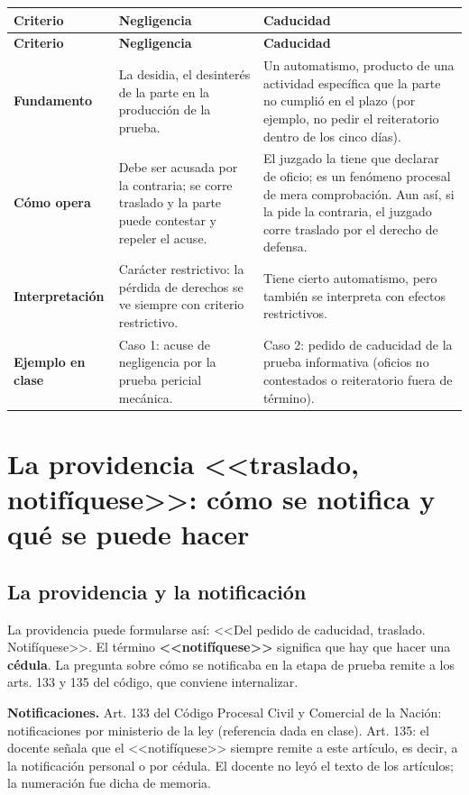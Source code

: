 \documentclass[12pt,oneside]{book}
\begin{document}
\begin{longtable}{@{}L{0.15\textwidth}L{0.36\textwidth}L{0.39\textwidth}@{}}
\toprule
\textbf{Criterio} & \textbf{Negligencia} & \textbf{Caducidad} \\
\midrule
\endfirsthead
\toprule
\textbf{Criterio} & \textbf{Negligencia} & \textbf{Caducidad} \\
\midrule
\endhead
\bottomrule
\endlastfoot
\textbf{Fundamento} & La desidia, el desinterés de la parte en la producción de la prueba. & Un automatismo, producto de una actividad específica que la parte no cumplió en el plazo (por ejemplo, no pedir el reiteratorio dentro de los cinco días). \\
\textbf{Cómo opera} & Debe ser acusada por la contraria; se corre traslado y la parte puede contestar y repeler el acuse. & El juzgado la tiene que declarar de oficio; es un fenómeno procesal de mera comprobación. Aun así, si la pide la contraria, el juzgado corre traslado por el derecho de defensa. \\
\textbf{Interpretación} & Carácter restrictivo: la pérdida de derechos se ve siempre con criterio restrictivo. & Tiene cierto automatismo, pero también se interpreta con efectos restrictivos. \\
\textbf{Ejemplo en clase} & Caso 1: acuse de negligencia por la prueba pericial mecánica. & Caso 2: pedido de caducidad de la prueba informativa (oficios no contestados o reiteratorio fuera de término). \\
\end{longtable}

\section{La providencia <<traslado, notifíquese>>: cómo se notifica y qué se puede hacer}

\subsection{La providencia y la notificación}

La providencia puede formularse así: <<Del pedido de caducidad, traslado. Notifíquese>>. El término \textbf{<<notifíquese>>} significa que hay que hacer una \textbf{cédula}. La pregunta sobre cómo se notificaba en la etapa de prueba remite a los arts. 133 y 135 del código, que conviene internalizar.

\begin{note}
\textbf{Notificaciones.} Art. 133 del Código Procesal Civil y Comercial de la Nación: notificaciones por ministerio de la ley (referencia dada en clase). Art. 135: el docente señala que el <<notifíquese>> siempre remite a este artículo, es decir, a la notificación personal o por cédula. El docente no leyó el texto de los artículos; la numeración fue dicha de memoria.
\end{note}
\end{document}
